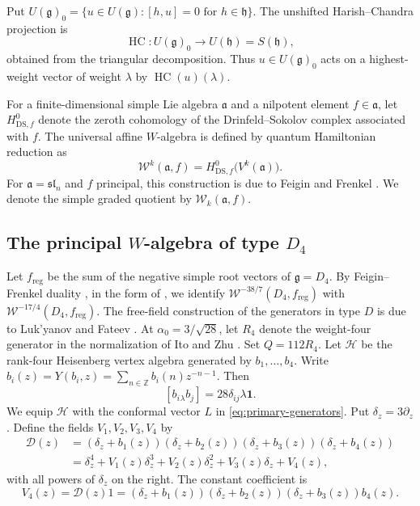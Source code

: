 \documentclass[11pt]{amsart}
\numberwithin{equation}{section}
\theoremstyle{definition}
\theoremstyle{remark}
\newcommand{\ZZ}{\mathbb Z}
\newcommand{\g}{\mathfrak g}
\newcommand{\h}{\mathfrak h}
\newcommand{\one}{\mathbf1}
\newcommand{\W}{\mathcal W}
\newcommand{\HC}{\operatorname{HC}}
\newcommand{\DS}{\mathrm{DS}}
\newcommand{\reg}{\mathrm{reg}}
\begin{document}
Put $U(\g)_0=\{u\in U(\g):[h,u]=0\text{ for }h\in\h\}$.
The unshifted Harish--Chandra projection is
\begin{equation}\label{eq:HC}
 \HC:U(\g)_0\longrightarrow U(\h)=S(\h),
\end{equation}
obtained from the triangular decomposition. Thus $u\in U(\g)_0$
acts on a highest-weight vector of weight $\lambda$ by
$\HC(u)(\lambda)$.


For a finite-dimensional simple Lie algebra $\mathfrak a$ and a nilpotent
element $f\in\mathfrak a$, let $H^0_{\DS,f}$ denote the zeroth cohomology
of the Drinfeld--Sokolov complex associated with $f$. The universal
affine $W$-algebra is defined by quantum Hamiltonian reduction \cite{KRW} as
\[
 \W^k(\mathfrak a,f)=H^0_{\DS,f}\bigl(V^k(\mathfrak a)\bigr).
\]
For $\mathfrak a=\mathfrak{sl}_n$ and $f$ principal, this construction
is due to Feigin and Frenkel \cite{FF}.
We denote the simple graded quotient by $\W_k(\mathfrak a,f)$.

\subsection{The principal \texorpdfstring{$W$}{W}-algebra of type
\texorpdfstring{$D_4$}{D4}}\label{subsec:principal-D4}
Let $f_{\reg}$ be the sum of the negative simple root vectors of $\g=D_4$.
By Feigin--Frenkel duality \cite{FF91}, in the form of
\cite[Theorem~5.6]{ACL}, we identify
$\W^{-38/7}(D_4,f_{\reg})$ with $\W^{-17/4}(D_4,f_{\reg})$.
The free-field construction of the generators in type $D$ is due to
Luk'yanov and Fateev \cite{LF}. At $\alpha_0=3/\sqrt{28}$, let $R_4$
denote the weight-four generator in the normalization of Ito and Zhu
\cite[(3.16)]{IZ}. Set $Q=112R_4$.
Let $\mathcal H$ be the rank-four Heisenberg vertex algebra generated
by $b_1,\ldots,b_4$. Write $b_i(z)=Y(b_i,z)=\sum_{n\in\ZZ}b_i(n)z^{-n-1}$. Then
\[
 [b_i{}_{\lambda} b_j]=28\delta_{ij}\lambda\one .
\]
We equip $\mathcal H$ with the conformal vector $L$ in
\eqref{eq:primary-generators}.
Put $\delta_z=3\partial_z$. Define the fields $V_1,V_2,V_3,V_4$ by
\[
\begin{aligned}
 \mathcal D(z)
   &=(\delta_z+b_1(z))(\delta_z+b_2(z))
     (\delta_z+b_3(z))(\delta_z+b_4(z))\\
   &=\delta_z^4+V_1(z)\delta_z^3+V_2(z)\delta_z^2
     +V_3(z)\delta_z+V_4(z),
\end{aligned}
\]
with all powers of $\delta_z$ on the right. The constant coefficient is
\[
 V_4(z)=\mathcal D(z)1
       =(\delta_z+b_1(z))(\delta_z+b_2(z))(\delta_z+b_3(z))b_4(z).
\]
\end{document}
